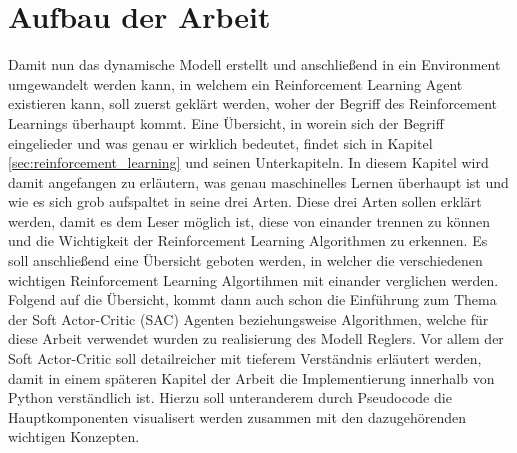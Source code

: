 \documentclass[]{iat}
\begin{document}
\section{Aufbau der Arbeit} \label{sec:aufbau_arbeit}
Damit nun das dynamische Modell erstellt und anschließend in ein Environment umgewandelt werden kann, in welchem ein Reinforcement Learning Agent existieren kann, soll zuerst geklärt werden, woher der Begriff des Reinforcement Learnings überhaupt kommt. Eine Übersicht, in worein sich der Begriff eingelieder und was genau er wirklich bedeutet, findet sich in Kapitel \ref{sec:reinforcement_learning} und seinen Unterkapiteln. In diesem Kapitel wird damit angefangen zu erläutern, was genau maschinelles Lernen überhaupt ist und wie es sich grob aufspaltet in seine drei Arten. Diese drei Arten sollen erklärt werden, damit es dem Leser möglich ist, diese von einander trennen zu können und die Wichtigkeit der Reinforcement Learning Algorithmen zu erkennen. Es soll anschließend eine Übersicht geboten werden, in welcher die verschiedenen wichtigen Reinforcement Learning Algortihmen mit einander verglichen werden. Folgend auf die Übersicht, kommt dann auch schon die Einführung zum Thema der Soft Actor-Critic (SAC) Agenten beziehungsweise Algorithmen, welche für diese Arbeit verwendet wurden zu realisierung des Modell Reglers. Vor allem der Soft Actor-Critic soll detailreicher mit tieferem Verständnis erläutert werden, damit in einem späteren Kapitel der Arbeit die Implementierung innerhalb von Python verständlich ist. Hierzu soll unteranderem durch Pseudocode die Hauptkomponenten visualisert werden zusammen mit den dazugehörenden wichtigen Konzepten.\\
\end{document}
